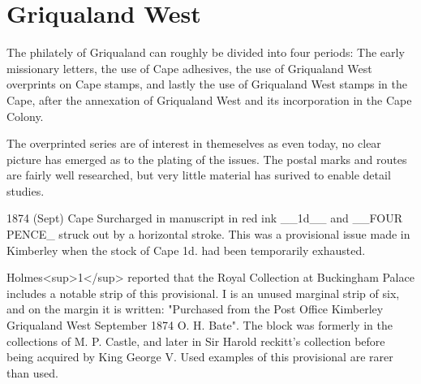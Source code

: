 \chapter{Griqualand West}

The philately of Griqualand can roughly be divided into four periods: The early missionary letters, the use of Cape adhesives, the use of Griqualand West overprints on Cape stamps, and lastly the use of Griqualand West stamps in the Cape, after the annexation of Griqualand West and its incorporation in the Cape Colony. 

The overprinted series are of interest in themeselves as even today, no clear picture has emerged as to the plating of the issues. The postal marks and routes are fairly well researched, but very little material has surived to enable detail studies.


1874 (Sept) Cape Surcharged in manuscript in red ink __1d__ and __FOUR PENCE_ struck out by a horizontal stroke. This was a provisional issue made in Kimberley when the stock of Cape 1d. had been temporarily exhausted.



Holmes<sup>1</sup> reported that the Royal Collection at Buckingham Palace includes a 
notable strip of this provisional. I is an unused marginal strip of six, and on the margin it is written: "Purchased from the Post Office Kimberley Griqualand West September 1874 O. H. Bate". The block was formerly in the collections of M. P. Castle, and later in Sir Harold reckitt's collection before being acquired by King George V. Used examples of this provisional are rarer than used.



\hline


